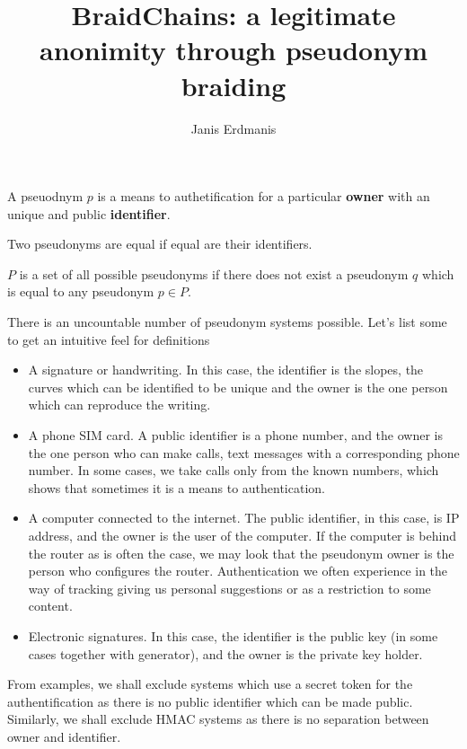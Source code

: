 \documentclass[12pt]{article}
\newenvironment{definition}[2][Definition]{\begin{trivlist}
\item[\hskip \labelsep {\bfseries #1}\hskip \labelsep {\bfseries #2.}]}{\end{trivlist}}
\begin{document}

\title{BraidChains: a legitimate anonimity through pseudonym braiding} %
\author{Janis Erdmanis} %

\maketitle

\begin{definition}{(pseudonym)} 
A pseuodnym $p$ is a means to authetification for a particular {\bf owner} with an unique and public {\bf identifier}.
\end{definition}

\begin{definition}{(pseudonym equality)}
  Two pseudonyms are equal if equal are their identifiers.
\end{definition}

\begin{definition}{(pseudonym set)}
  $P$ is a set of all possible pseudonyms if there does not exist a pseudonym $q$ which is equal to any pseudonym $p \in P$.
\end{definition}

There is an uncountable number of pseudonym systems possible. Let's list some to get an intuitive feel for definitions
\begin{itemize}
\item A signature or handwriting. In this case, the identifier is the slopes, the curves which can be identified to be unique and the owner is the one person which can reproduce the writing. 
\item A phone SIM card. A public identifier is a phone number, and the owner is the one person who can make calls, text messages with a corresponding phone number. In some cases, we take calls only from the known numbers, which shows that sometimes it is a means to authentication.
\item A computer connected to the internet. The public identifier, in this case, is IP address, and the owner is the user of the computer. If the computer is behind the router as is often the case, we may look that the pseudonym owner is the person who configures the router. Authentication we often experience in the way of tracking giving us personal suggestions or as a restriction to some content. 
\item Electronic signatures. In this case, the identifier is the public key (in some cases together with generator), and the owner is the private key holder. 
\end{itemize}
From examples, we shall exclude systems which use a secret token for the authentification as there is no public identifier which can be made public. Similarly, we shall exclude HMAC systems as there is no separation between owner and identifier. 
\end{document}
